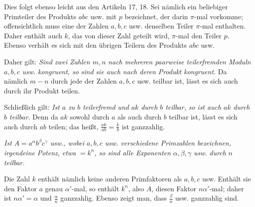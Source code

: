 Dies folgt ebenso leicht aus den Artikeln 17, 18. Sei nämlich ein beliebiger Primteiler des Produkts $abc$ usw. mit $p$ bezeichnet, der darin $\pi$-mal vorkomme; offensichtlich muss eine der Zahlen $a, b, c$ usw. denselben Teiler $\pi$-mal enthalten. Daher enthält auch $k$, das von dieser Zahl geteilt wird, $\pi$-mal den Teiler $p$. Ebenso verhält es sich mit den übrigen Teilern des Produkts $abc$ usw.

Daher gilt: \emph{Sind zwei Zahlen $m, n$ nach mehreren paarweise teilerfremden Moduln $a, b, c$ usw. kongruent, so sind sie auch nach deren Produkt kongruent.} Da nämlich $m-n$ durch jede der Zahlen $a, b, c$ usw. teilbar ist, lässt es sich auch durch ihr Produkt teilen.

Schließlich gilt: \emph{Ist $a$ zu $b$ teilerfremd und $ak$ durch $b$ teilbar, so ist auch $ak$ durch $b$ teilbar.} Denn da $ak$ sowohl durch $a$ als auch durch $b$ teilbar ist, lässt es sich auch durch $ab$ teilen; das heißt, $\frac{ak}{ab}=\frac{k}{b}$ ist ganzzahlig.

\emph{Ist $A=a^\alpha b^\beta c^\gamma$ usw., wobei $a, b, c$ usw. verschiedene Primzahlen bezeichnen, irgendeine Potenz, etwa $=k^n$, so sind alle Exponenten $\alpha, \beta, \gamma$ usw. durch $n$ teilbar.}

Die Zahl $k$ enthält nämlich keine anderen Primfaktoren als $a, b, c$ usw. Enthält sie den Faktor $a$ genau $\alpha'$-mal, so enthält $k^n$, also $A$, diesen Faktor $n\alpha'$-mal; daher ist $n\alpha'=\alpha$ und $\frac{\alpha}{n}$ ganzzahlig. Ebenso zeigt man, dass $\frac{\beta}{n}$ usw. ganzzahlig sind.
